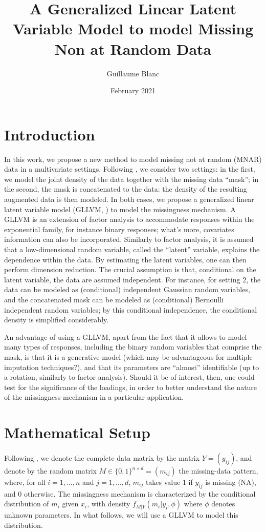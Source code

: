 \documentclass{article}
\title{A Generalized Linear Latent Variable Model to model Missing Non at Random Data}
\author{Guillaume Blanc}
\date{February 2021}
\begin{document}
\maketitle
\section{Introduction}
In this work, we propose a new method to model missing not at random (MNAR) data in a multivariate settings. Following \textcite{sportisse_imputation_2020}, we consider two settings: in the first, we model the joint density of the data together with the missing data ``mask''; in the second, the mask is concatenated to the data: the density of the resulting augmented data is then modeled. In both cases, we propose a generalized linear latent variable model (GLLVM, \cite{skrondal_generalized_2004}) to model the missingness mechanism. A GLLVM is an extension of factor analysis to accommodate responses within the exponential family, for instance binary responses; what's more, covariates information can also be incorporated. Similarly to factor analysis, it is assumed that a low-dimensional random variable, called the ``latent'' variable, explains the dependence within the data. By estimating the latent variables, one can then perform dimension reduction. The crucial assumption is that, conditional on the latent variable, the data are assumed independent. For instance, for setting 2, the data can be modeled as (conditional) independent Gaussian random variables, and the concatenated mask can be modeled as (conditional) Bernoulli independent random variables; by this conditional independence, the conditional density is simplified considerably.

An advantage of using a GLLVM, apart from the fact that it allows to model many types of responses, including the binary random variables that comprise the mask, is that it is a generative model (which may be advantageous for multiple imputation techniques?), and that its parameters are ``almost'' identifiable (up to a rotation, similarly to factor analysis). Should it be of interest, then, one could test for the significance of the loadings, in order to better understand the nature of the missingness mechanism in a particular application.

\section{Mathematical Setup}
Following \textcite{little_statistical_2019}, we denote the complete data matrix  by the matrix $Y=(y_{ij})$, and denote by the random matrix $M \in \{0, 1\}^{n\times d} = (m_{ij})$ the missing-data pattern, where, for all $i=1, \dots, n$ and $j=1,  \dots, d$,  $m_{ij}$ takes value $1$ if $y_{ij}$ is missing (NA), and $0$ otherwise. The missingness mechanism is characterized by the conditional distribution of $m_i$ given $x_i$, with density $f_{M|Y}(m_i|y_i, \phi)$ where $\phi$ denotes unknown parameters. In what follows, we will use a GLLVM to model this distribution.
\end{document}
